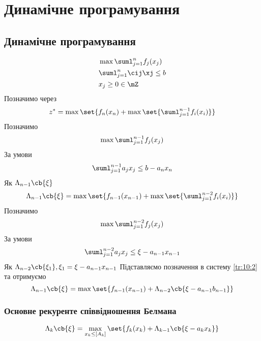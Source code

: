 \chapter{Динамічне програмування}
\section{Динамічне програмування}
\begin{eqnarray}
&\max \suml_{j=1}^n f_j(x_j)\label{tr:10:1}\\
& \suml_{j=1}^n \cij \xj \leq b\\
& x_j\geq 0\in\mZ\label{tr:10:3}
\end{eqnarray}
Позначимо через 
\begin{equation}
	z^* = \max \set{f_n(x_n) + \max \set{\suml_{j=1}^{n-1} f_i(x_i)}}
\end{equation}
Позначимо
\begin{equation}
	\max \suml_{j=1}^{n-1} f_j(x_j)
\end{equation}
За умови
\begin{equation}
	\suml_{j=1}^{n-1} a_j x_j \leq b - a_n x_n
\end{equation}
Як $\Lambda_{n-1}\cb{\xi}$
\begin{equation}\label{tr:10:2}
	\Lambda_{n-1}\cb{\xi} = \max \set{f_{n-1}(x_{n-1}) + \max \set{\suml_{j=1}^{n-2} f_i(x_i)}}
\end{equation}
Позначимо
\begin{equation}
	\max \suml_{j=1}^{n-2} f_j(x_j)
\end{equation}
За умови
\begin{equation}
	\suml_{j=1}^{n-2} a_j x_j \leq \xi - a_{n-1} x_{n-1}
\end{equation}
Як $\Lambda_{n-2}\cb{\xi_1},\xi_1 = \xi - a_{n-1} x_{n-1}$
Підставляємо позначення в систему \eqref{tr:10:2} та отримуємо
\begin{equation}
	\Lambda_{n-1}\cb{\xi} = \max\set{f_{n-1}(x_{n-1}) +\Lambda_{n-2} \cb{\xi - a_{n-1}b_{n-1}}}
\end{equation}
\subsection{Основне рекуренте співвідношення Белмана}
\begin{equation}\label{tr:10:4}
\Lambda_k\cb{\xi} = \max\limits_{x_k \leq [A_k]}\set{f_k(x_k) + \Lambda_{k-1}\cb{\xi-a_kx_k}}
\end{equation}
